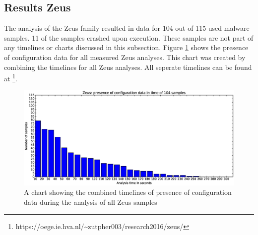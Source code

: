 \documentclass[conference]{IEEEtran}
\begin{document}
\subsection{Results Zeus}
The analysis of the Zeus family resulted in data for 104 out of 115 used malware samples. 11 of the samples crashed upon execution. These samples are not part of any timelines or charts discussed in this subsection. Figure \ref{fig:zeus-bar} shows the presence of configuration data for all measured Zeus analyses. This chart was created by combining the timelines for all Zeus analyses. All seperate timelines can be found at \footnote{https://oege.ie.hva.nl/\textasciitilde{}zutpher003/research2016/zeus/}.\\

\begin{figure}[!h]
	\hspace{-3cm}
    \includegraphics[width=13cm,trim=-70mm 0mm 0mm 9mm, clip=true]{images/zeus/Zeus-barchart.eps}
    \caption{A chart showing the combined timelines of presence of configuration data during the analysis of all Zeus samples}
    \label{fig:zeus-bar}
\end{figure}
\end{document}
